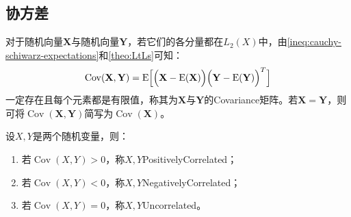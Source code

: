 \subsection{协方差}
\begin{definition}
	对于随机向量$\mathbf{X}$与随机向量$\mathbf{Y}$，若它们的各分量都在$L_2(X)$中，由\cref{ineq:cauchy-schiwarz-expectations}和\cref{theo:LtLs}可知：
	\begin{equation*}
		\operatorname{Cov}(\mathbf{X},\mathbf{Y})=\operatorname{E}\Bigl[\Bigl(\mathbf{X}-\operatorname{E}(\mathbf{X})\Bigr)\Bigl(\mathbf{Y}-\operatorname{E}(\mathbf{Y})\Bigr)^T\Bigr]
	\end{equation*}
	一定存在且每个元素都是有限值，称其为$\mathbf{X}$与$\mathbf{Y}$的\gls{Covariance}矩阵。若$\mathbf{X}=\mathbf{Y}$，则可将$\operatorname{Cov}(\mathbf{X},\mathbf{Y})$简写为$\operatorname{Cov}(\mathbf{X})$。
\end{definition}
\begin{definition}
	设$X,Y$是两个随机变量，则：
	\begin{enumerate}
		\item 若$\operatorname{Cov}(X,Y)>0$，称$X,Y$\gls{PositivelyCorrelated}；
		\item 若$\operatorname{Cov}(X,Y)<0$，称$X,Y$\gls{NegativelyCorrelated}；
		\item 若$\operatorname{Cov}(X,Y)=0$，称$X,Y$\gls{Uncorrelated}。
	\end{enumerate}
\end{definition}
